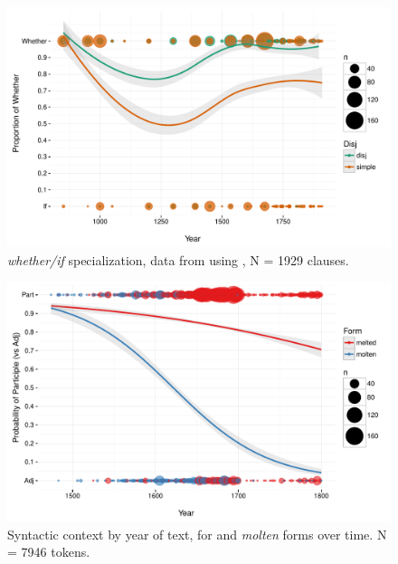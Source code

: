\documentclass{artikel3}
\begin{document}
\begin{figure}
    \begin{center}
    \includegraphics[scale=.6]{whetherifEngWQByYearUnbinned.pdf}
    \caption{\textsl{whether/if} specialization, data from \citet{baileywallenbergwurff2012} using \citet{ycoe,ppcme2,ppceme,ppcmbe}, N = 1929 clauses.}
       \label{whether}
    \end{center}
\end{figure}

\begin{figure}
    \begin{center}
    \includegraphics[scale=.6]{ContextByDateUnbinnedWithDots2.pdf}
    \caption{Syntactic context by year of text, for  and \textsl{molten} forms over time. N =  7946 tokens.}
       \label{molten1}
    \end{center}
\end{figure}
\end{document}
